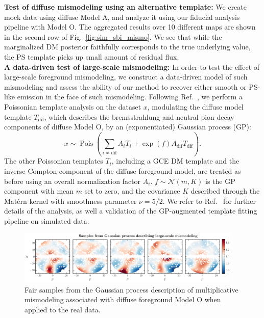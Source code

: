 \documentclass[prd,aps,10pt,nofootinbib,twocolumn,superscriptaddress,preprintnumbers,balancelastpage,longbibliography]{revtex4-1}
\begin{document}
\noindent
\textbf{Test of diffuse mismodeling using an alternative template:}
We create mock data using diffuse Model A, and analyze it using our fiducial analysis pipeline with Model O. The aggregated results over 10 different maps are shown in the second row of Fig.~\ref{fig:sim_sbi_mismo}. We see that while the marginalized DM posterior faithfully corresponds to the true underlying value, the PS template picks up small amount of residual flux. \\

\noindent
\textbf{A data-driven test of large-scale mismodeling:}
In order to test the effect of large-scale foreground mismodeling, we construct a data-driven model of such mismodeling and assess the ability of our method to recover either smooth or PS-like emission in the face of such mismodeling.  Following Ref.~\cite{Mishra-Sharma:2020kjb}, we perform a Poissonian template analysis on the \Fermi dataset $x$, modulating the diffuse model template $T_{\mathrm{dif}}$, which describes the bremsstrahlung and neutral pion decay components of diffuse Model O, by an (exponentiated) Gaussian process (GP):
\begin{equation}
x \sim \operatorname{Pois}\left(\sum_{i \neq \mathrm{dif}} A_{i} T_{i}+\exp \left(f\right) A_{\mathrm{dif}} T_{\mathrm{dif}}\right).
\end{equation}
The other Poissonian templates $T_{i}$, including a GCE DM template and the inverse Compton component of the diffuse foreground model, are treated as before using an overall normalization factor $A_{i}$. $f \sim \mathcal{N}(m, K)$ is the GP component with mean $m$ set to zero, and the covariance $K$ described through the Mat\'ern kernel with smoothness parameter $\nu = 5/2$. We refer to Ref.~\cite{Mishra-Sharma:2020kjb} for further details of the analysis, as well a validation of the GP-augmented template fitting pipeline on simulated data.

%
\begin{figure}
\centering
\includegraphics[width=0.95\textwidth]{plots/dd_mismo_map.pdf}
\caption{Fair samples from the Gaussian process description of multiplicative mismodeling associated with diffuse foreground Model O when applied to the real \Fermi data.}
\label{fig:dd_mismo_map}
\end{figure}
%
\end{document}
